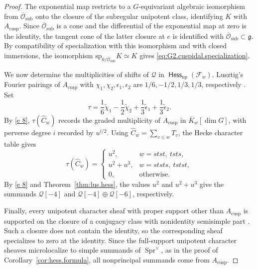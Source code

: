 \documentclass[11pt]{amsart}
\numberwithin{equation}{section}
\theoremstyle{definition}
\def\sp{\mathrm{sp}}
\DeclareMathOperator{\Hess}{\mathsf{Hess}}
\def\fg{\mathfrak {g}}
\DeclareMathOperator{\Spr}{\mathrm{Spr}}
\begin{document}
\begin{proof}
The exponential map restricts to a $G$-equivariant algebraic isomorphism from $\overline{\mathcal O}_{\mathrm{sub}}$ onto the closure of the subregular unipotent class, identifying $K$ with $A_{\mathrm{cusp}}$.
Since $\overline{\mathcal O}_{\mathrm{sub}}$ is a cone and the differential of the exponential map at zero is the identity, the tangent cone of the latter closure at $e$ is identified with $\overline{\mathcal O}_{\mathrm{sub}}\subset\fg$.
By compatibility of specialization with this isomorphism and with closed immersions, the isomorphism $\sp_{0/\overline{\mathcal O}_{\mathrm{sub}}}K\simeq K$ gives \eqref{eq:G2.cuspidal.specialization}.

\smallskip

We now determine the multiplicities of shifts of $\mathcal Q$ in $\Hess_{\mathrm{np}}(\mathcal F_w)$.
Lusztig's Fourier pairings of $A_{\mathrm{cusp}}$ with $\chi_1,\chi_2,\epsilon_1,\epsilon_2$ are $1/6,-1/2,1/3,1/3$, respectively
\cite[pp.~95, 110]{Lus84}.
Set
\[
\tau=\frac16\widetilde\chi_1-\frac12\widetilde\chi_2
     +\frac13\widetilde\epsilon_1
     +\frac13\widetilde\epsilon_2.
\]
By \eqref{e 8}, $\tau(\widehat C_w)$ records the graded multiplicity of $A_{\mathrm{cusp}}$ in $\overline K_w[\dim G]$, with perverse degree $i$ recorded by $u^{i/2}$.
Using $\widehat C_w=\sum_{v\leq w}T_v$, the Hecke character table \cite[p.~270]{GP} gives
\[
\tau(\widehat C_w)=
\begin{cases}
u^2,&w=stst,\ tsts,\\
u^2+u^3,&w=ststs,\ tstst,\\
0,&\text{otherwise}.
\end{cases}
\]
By \eqref{e 8} and Theorem~\ref{thm:lus.hess}, the values $u^2$ and $u^2+u^3$ give the summands $\mathcal Q[-4]$ and $\mathcal Q[-4]\oplus\mathcal Q[-6]$, respectively.

Finally, every unipotent character sheaf with proper support other than $A_{\mathrm{cusp}}$ is supported on the closure of a conjugacy class with nonidentity semisimple part \cite[Appendix~C]{DLM}.
Such a closure does not contain the identity, so the corresponding sheaf specializes to zero at the identity.
Since the full-support unipotent character sheaves microlocalize to simple summands of $\Spr^\vee$, as in the proof of Corollary~\ref{cor:hess.formula}, all nonprincipal summands come from $A_{\mathrm{cusp}}$.
\end{proof}
\end{document}

